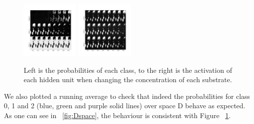 \documentclass{article}
\begin{document}
\begin{figure}[H]
	\centering
	\includegraphics[width=0.25\textwidth]{DNN_prop_im.png} \hspace*{-.5cm}
	\includegraphics[width=0.25\textwidth]{DNN_sigmoid_im.png}
	\caption{Left is the probabilities of each class, to the right is the activation of each hidden unit when changing the concentration of each substrate.}
    \label{fig:activations}
\end{figure}
%
We also plotted a running average to check that indeed the probabilities for class 0, 1 and 2 (blue, green and purple solid lines) over space D behave as expected. As one can see in ~\ref{fig:Dspace}, the behaviour is consistent with Figure ~\ref{fig:activations}.
%
\end{document}
